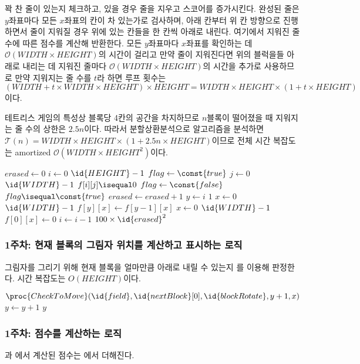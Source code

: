 \newpage

꽉 찬 줄이 있는지 체크하고, 있을 경우 줄을 지우고 스코어를 증가시킨다. 완성된 줄은 $y$좌표마다 모든 $x$좌표의 칸이 차 있는가로 검사하며,
아래 칸부터 위 칸 방향으로 진행하면서 줄이 지워질 경우 위에 있는 칸들을 한 칸씩 아래로 내린다. 여기에서 지워진 줄 수에 따른 점수를 계산해 반환한다.
모든 $y$좌표마다 $x$좌표를 확인하는 데 $\mathcal{O}\left(WIDTH\times HEIGHT\right)$의 시간이 걸리고 만약 줄이 지워진다면
위의 블럭을들 아래로 내리는 데 지워진 줄마다 $\mathcal{O}\left(WIDTH\times HEIGHT\right)$의 시간을 추가로 사용하므로
만약 지워지는 줄 수를 $t$라 하면 루프 횟수는 $\left(WIDTH + t \times WIDTH\times HEIGHT\right)\times HEIGHT=
WIDTH\times HEIGHT\times\left(1 + t\times HEIGHT\right)$이다.

테트리스 게임의 특성상 블록당 4칸의 공간을 차지하므로 $n$블록이 떨어졌을 때 지워지는 줄 수의 상한은 $2.5n$이다. 따라서 분할상환분석으로 알고리즘을 분석하면
$\mathcal{T}\left(n\right)=WIDTH\times HEIGHT\times\left(1 + 2.5n \times HEIGHT\right)$이므로 전체 시간 복잡도는
amortized $\mathcal{O}\left(WIDTH\times HEIGHT^2\right)$이다.

\begin{codebox}
\li $erased \gets 0$
\li \For $i \gets 0$ \To $\id{HEIGHT} - 1$
\li \Do
        $flag \gets \const{true}$
\li     \For $j \gets 0$ \To $\id{WIDTH} - 1$
\li     \Do
            \If $f[i][j] \isequal 0$
\li         \Then
                $flag \gets \const{false}$
            \End
        \End
\li     \If $flag \isequal \const{true}$
            \Then
\li             $erased \gets erased + 1$
\li             \For $y \gets i$ \Downto $1$
\li             \Do
                    \For $x \gets 0$ \To $\id{WIDTH} - 1$
\li                 \Do
                        $f[y][x] \gets f[y - 1][x]$
                    \End
                \End
\li             \For $x \gets 0$ \To $\id{WIDTH} - 1$
\li             \Do
                    $f[0][x] \gets 0$
                \End
\li             $i \gets i - 1$
            \End
        \End
    \End
\li \Return $100 \times \id{erased}^2$
\end{codebox}

\subsubsection{1주차: 현재 블록의 그림자 위치를 계산하고 표시하는 로직} 그림자를 그리기 위해 현재 블록을 얼마만큼 아래로 내릴 수 있는지 를 이용해 판정한다.
시간 복잡도는 $O\left(HEIGHT\right)$이다.

\begin{codebox}
\li \While $\proc{CheckToMove}(\id{field}, \id{nextBlock}[0], \id{blockRotate}, y + 1, x)$
\li \Do
        $y \gets y + 1$
    \End
\li \Return $y$
\end{codebox}

\subsubsection{1주차: 점수를 계산하는 로직} 과 에서 계산된 점수는 에서 더해진다.